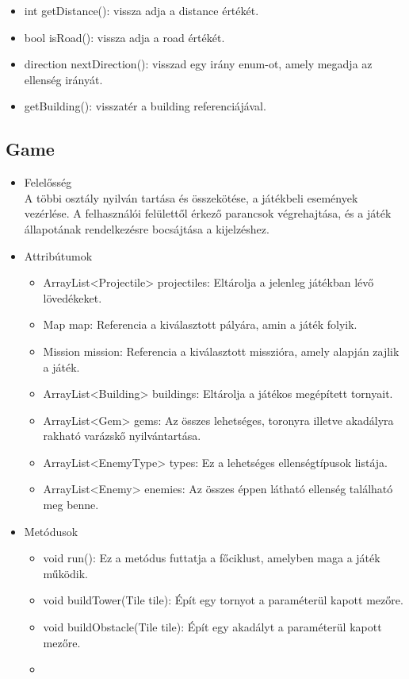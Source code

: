 \begin{itemize}
\begin{itemize}
		\item int getDistance(): vissza adja a distance értékét.
		\item bool isRoad(): vissza adja a road értékét.
		\item direction nextDirection(): visszad egy irány enum-ot, amely megadja az ellenség irányát.
		\item getBuilding(): visszatér a building referenciájával.
	\end{itemize}
\end{itemize}

\subsection{Game}
\begin{itemize}
\item Felelősség\\
A többi osztály nyilván tartása és összekötése, a játékbeli események vezérlése. A felhasználói felülettől érkező parancsok végrehajtása, és a játék állapotának rendelkezésre bocsájtása a kijelzéshez.

\item Attribútumok\\
	\begin{itemize}
		\item ArrayList<Projectile> projectiles: Eltárolja a jelenleg játékban lévő lövedékeket.
		\item Map map: Referencia a kiválasztott pályára, amin a játék folyik.
		\item Mission mission: Referencia a kiválasztott misszióra, amely alapján zajlik a játék.
		\item ArrayList<Building> buildings: Eltárolja a játékos megépített tornyait.
		\item ArrayList<Gem> gems: Az összes lehetséges, toronyra illetve akadályra rakható varázskő nyilvántartása.
		\item ArrayList<EnemyType> types: Ez a lehetséges ellenségtípusok listája.
		\item ArrayList<Enemy> enemies: Az összes éppen látható ellenség található meg benne.
	\end{itemize}
\item Metódusok\\
	\begin{itemize}
		\item void run(): Ez a metódus futtatja a főciklust, amelyben maga a játék működik.
		\item void buildTower(Tile tile): Épít egy tornyot a paraméterül kapott mezőre. 
		\item void buildObstacle(Tile tile): Épít egy akadályt a paraméterül kapott mezőre. 
		\item {}
	\end{itemize}
\end{itemize}

